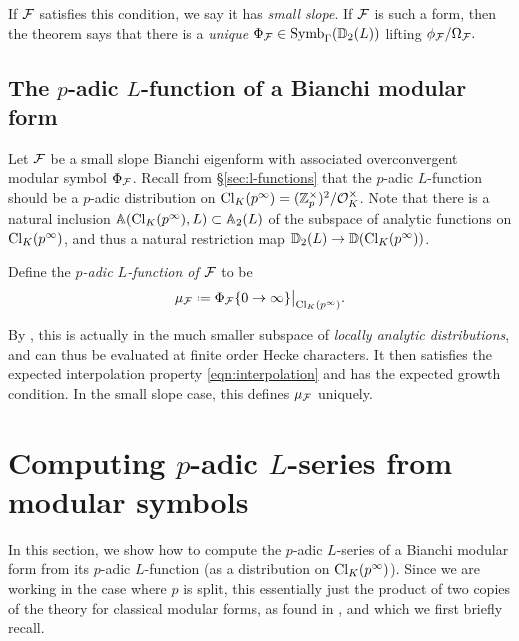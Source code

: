 \documentclass[a4paper,11pt]{article}
\numberwithin{equation}{section}
\begin{document}
If $\mathcal{F}$ satisfies this condition, we say it has \emph{small slope}. If $\mathcal{F}$ is such a form, then the theorem says that there is a \emph{unique} $\Phi_{\mathcal{F}} \in \mathrm{Symb}_\Gamma(\mathbb{D}_2(L))$ lifting $\phi_{\mathcal{F}}/\Omega_{\mathcal{F}}.$


\subsection{The $p$-adic $L$-function of a Bianchi modular form}\label{padic lfunction section}

Let $\mathcal{F}$ be a small slope Bianchi eigenform with associated overconvergent modular symbol $\Phi_{\mathcal{F}}$. Recall from \S\ref{sec:l-functions} that the $p$-adic $L$-function should be a $p$-adic distribution on $\mathrm{Cl}_K(p^\infty) = (\mathbb{Z}_p^\times)^2/\mathcal{O}_K^\times$. Note that there is a natural inclusion $\mathbb{A}(\mathrm{Cl}_K(p^\infty),L) \subset \mathbb{A}_2(L)$
of the subspace of analytic functions on $\mathrm{Cl}_K(p^\infty)$, and thus a natural restriction map $\mathbb{D}_2(L) \to \mathbb{D}(\mathrm{Cl}_K(p^\infty))$.

\begin{definition}
Define the \emph{$p$-adic $L$-function of $\mathcal{F}$} to be
\[
	\mu_{\f} \defeq \Phi_{\f}\{0 \to \infty\}\big|_{\cl_K(p^\infty)}.
\]
\end{definition}

By \cite[Thm.~7.4]{Wil17}, this is actually in the much smaller subspace of \emph{locally analytic distributions}, and can thus be evaluated at finite order Hecke characters. It then satisfies the expected interpolation property \eqref{eqn:interpolation} and has the expected growth condition. In the small slope case, this defines $\mu_{\mathcal{F}}$ uniquely.

\section{Computing \texorpdfstring{$p$}{p}-adic \texorpdfstring{$L$}{L}-series from modular symbols}
In this section, we show how to compute the $p$-adic $L$-series of a Bianchi modular form from its $p$-adic $L$-function (as a distribution on $\mathrm{Cl}_K(p^\infty)$). Since we are working in the case where $p$ is split, this essentially just the product of two copies of the theory for classical modular forms, as found in \cite[\S9]{PS11}, and which we first briefly recall.
\end{document}
